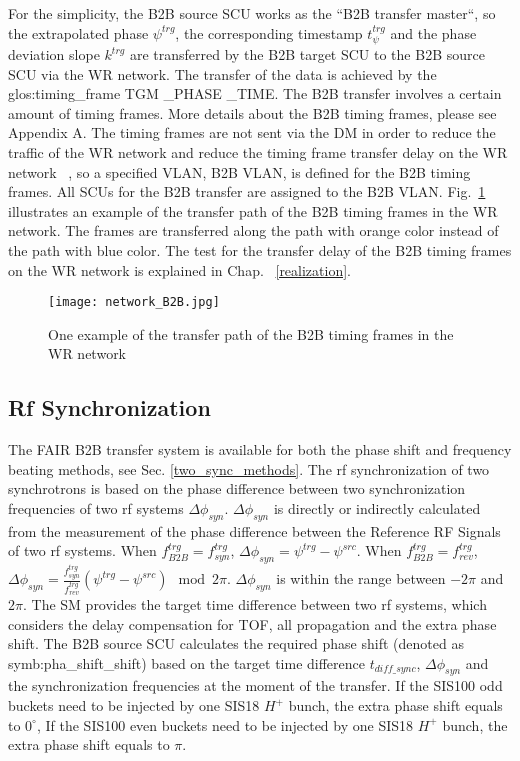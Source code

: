For the simplicity, the B2B source SCU works as the ``B2B transfer master``, so the extrapolated phase $\psi^\mathit{trg}$, the corresponding timestamp $t_\psi^\mathit{trg}$ and the phase deviation slope $k^\mathit{trg}$ are transferred by the B2B target SCU to the B2B source SCU via the WR network. The transfer of the data is achieved by the \gls{glos:timing_frame} TGM \_PHASE \_TIME. The B2B transfer involves a certain amount of timing frames. More details about the B2B timing frames, please see Appendix A. The timing frames are not sent via the DM in order to reduce the traffic of the WR network and reduce the timing frame transfer delay on the WR network ~\cite{bai_concept_2016}, so a specified VLAN, B2B \gls{VLAN}, is defined for the B2B timing frames. All SCUs for the B2B transfer are assigned to the B2B VLAN. Fig.~\ref{network_B2B} illustrates an example of the transfer path of the B2B timing frames in the WR network. The frames are transferred along the path with orange color instead of the path with blue color. The test for the transfer delay of the B2B timing frames on the WR network is explained in Chap. ~\ref{realization}.
 \begin{figure}[!htb]
   \centering   
   \texttt{[image: network\_B2B.jpg]}
   \caption{One example of the transfer path of the B2B timing frames in the WR network}
   \label{network_B2B}
\end{figure}
\subsection{Rf Synchronization}
The FAIR B2B transfer system is available for both the phase shift and frequency beating methods, see Sec. \ref{two_sync_methods}. The rf synchronization of two synchrotrons is based on the phase difference between two synchronization frequencies of two rf systems $\Delta \phi_\mathit{syn}$. $\Delta \phi_\mathit{syn}$ is directly or indirectly calculated from the measurement of the phase difference between the Reference RF Signals of two rf systems. When $f_{\mathit{B2B}}^{trg}=f_{\mathit{syn}}^{trg}$, $\Delta \phi_\mathit{syn}=\psi^\mathit{trg}-\psi^\mathit{src}$. When $f_{\mathit{B2B}}^{trg}=f_{\mathit{rev}}^{trg}$, $\Delta \phi_\mathit{syn}=\frac{f_{\mathit{syn}}^{trg}}{f_{\mathit{rev}}^{trg}}(\psi^\mathit{trg}-\psi^\mathit{src}) \mod 2\pi$. $\Delta \phi_\mathit{syn}$ is within the range between $-2\pi$ and $2\pi$. The SM provides the target time difference between two rf systems, which considers the delay compensation for TOF, all propagation and the extra phase shift. The B2B source SCU calculates the required phase shift (denoted as \gls{symb:pha_shift_shift}) based on the target time difference $t_{\mathit{diff\_sync}}$, $\Delta \phi_\mathit{syn}$ and the synchronization frequencies at the moment of the transfer. If the SIS100 odd buckets need to be injected by one SIS18 $H^+$ bunch, the extra phase shift equals to $0^\circ$, If the SIS100 even buckets need to be injected by one SIS18 $H^+$ bunch, the extra phase shift equals to $\pi$. 



